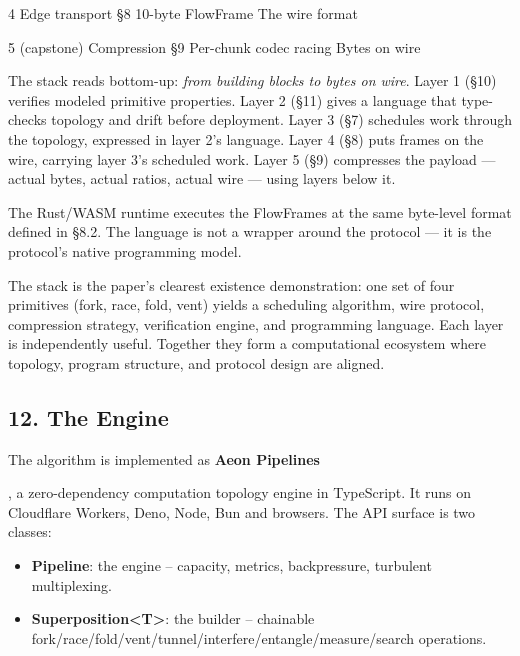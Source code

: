 \documentclass[
]{article}
\providecommand{\tightlist}{%
  \setlength{\itemsep}{0pt}\setlength{\parskip}{0pt}}
\begin{document}
4 \textbar{} Edge transport \textbar{} §8 \textbar{} 10-byte FlowFrame
\textbar{} The wire format \textbar{}

5 (capstone) \textbar{} Compression \textbar{} §9 \textbar{} Per-chunk
codec racing \textbar{} Bytes on wire \textbar{}

The stack reads bottom-up: \emph{from building blocks to bytes on wire}.
Layer 1 (§10) verifies modeled primitive properties. Layer 2 (§11) gives
a language that type-checks topology and drift before deployment. Layer
3 (§7) schedules work through the topology, expressed in layer 2's
language. Layer 4 (§8) puts frames on the wire, carrying layer 3's
scheduled work. Layer 5 (§9) compresses the payload --- actual bytes,
actual ratios, actual wire --- using layers below it.

The Rust/WASM runtime executes the FlowFrames at the same byte-level
format defined in §8.2. The language is not a wrapper around the
protocol --- it is the protocol's native programming model.

The stack is the paper's clearest existence demonstration: one set of
four primitives (fork, race, fold, vent) yields a scheduling algorithm,
wire protocol, compression strategy, verification engine, and
programming language. Each layer is independently useful. Together they
form a computational ecosystem where topology, program structure, and
protocol design are aligned.

\subsection{\texorpdfstring{\textbf{12. The
Engine}}{12. The Engine}}\label{the-engine}

The algorithm is implemented as \textbf{Aeon Pipelines}

, a zero-dependency computation topology engine in TypeScript. It runs
on Cloudflare Workers, Deno, Node, Bun and browsers. The API surface is
two classes:

\begin{itemize}
\tightlist
\item
  \textbf{Pipeline}: the engine -- capacity, metrics, backpressure,
  turbulent multiplexing.\\
\item
  \textbf{Superposition\textless T\textgreater{}}: the builder --
  chainable fork/race/fold/vent/tunnel/interfere/entangle/measure/search
  operations.
\end{itemize}
\end{document}
